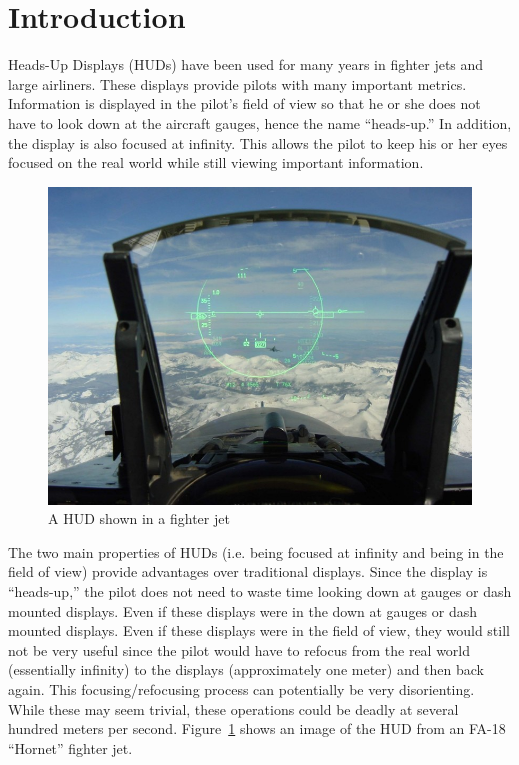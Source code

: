 \section{Introduction}

Heads-Up Displays (HUDs) have been used for many years in fighter jets and
large airliners. These displays provide pilots with many important metrics.
Information is displayed in the pilot's field of view so that he or she
does not have to look down at the aircraft gauges, hence the name
``heads-up.'' In addition, the display is also focused at infinity. This
allows the pilot to keep his or her eyes focused on the real world while
still viewing important information.

\begin{figure}[h]
\includegraphics[width=\textwidth]{img/JetHUD.jpg}
\caption{A HUD shown in a fighter jet}
\label{fig:jetHUD}
\end{figure}

The two main properties of HUDs (i.e. being focused at infinity and being
in the field of view) provide advantages over traditional displays. Since
the display is ``heads-up,'' the pilot does not need to waste time looking
down at gauges or dash mounted displays. Even if these displays were in the
down at gauges or dash mounted displays. Even if these displays were in the
field of view, they would still not be very useful since the pilot would
have to refocus from the real world (essentially infinity) to the displays
(approximately one meter) and then back again. This focusing/refocusing
process can potentially be very disorienting. While these may seem trivial,
these operations could be deadly at several hundred meters per second.
Figure~\ref{fig:jetHUD} shows an image of the HUD from an FA-18 ``Hornet''
fighter jet.

